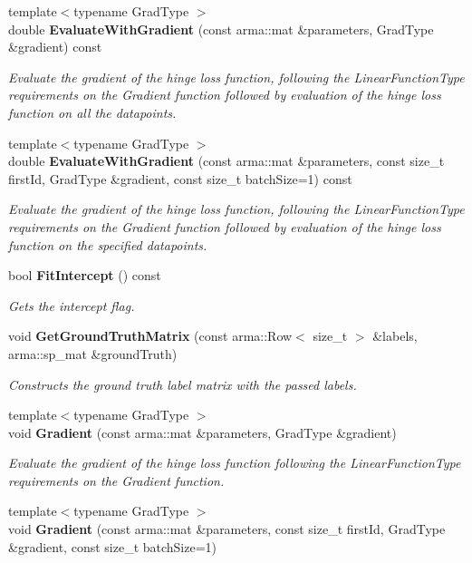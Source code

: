 \begin{DoxyCompactItemize}
{\footnotesize template$<$typename Grad\+Type $>$ }\\double \textbf{ Evaluate\+With\+Gradient} (const arma\+::mat \&parameters, Grad\+Type \&gradient) const
\begin{DoxyCompactList}\small\item\em Evaluate the gradient of the hinge loss function, following the Linear\+Function\+Type requirements on the Gradient function followed by evaluation of the hinge loss function on all the datapoints. \end{DoxyCompactList}\item 
{\footnotesize template$<$typename Grad\+Type $>$ }\\double \textbf{ Evaluate\+With\+Gradient} (const arma\+::mat \&parameters, const size\+\_\+t first\+Id, Grad\+Type \&gradient, const size\+\_\+t batch\+Size=1) const
\begin{DoxyCompactList}\small\item\em Evaluate the gradient of the hinge loss function, following the Linear\+Function\+Type requirements on the Gradient function followed by evaluation of the hinge loss function on the specified datapoints. \end{DoxyCompactList}\item 
bool \textbf{ Fit\+Intercept} () const
\begin{DoxyCompactList}\small\item\em Gets the intercept flag. \end{DoxyCompactList}\item 
void \textbf{ Get\+Ground\+Truth\+Matrix} (const arma\+::\+Row$<$ size\+\_\+t $>$ \&labels, arma\+::sp\+\_\+mat \&ground\+Truth)
\begin{DoxyCompactList}\small\item\em Constructs the ground truth label matrix with the passed labels. \end{DoxyCompactList}\item 
{\footnotesize template$<$typename Grad\+Type $>$ }\\void \textbf{ Gradient} (const arma\+::mat \&parameters, Grad\+Type \&gradient)
\begin{DoxyCompactList}\small\item\em Evaluate the gradient of the hinge loss function following the Linear\+Function\+Type requirements on the Gradient function. \end{DoxyCompactList}\item 
{\footnotesize template$<$typename Grad\+Type $>$ }\\void \textbf{ Gradient} (const arma\+::mat \&parameters, const size\+\_\+t first\+Id, Grad\+Type \&gradient, const size\+\_\+t batch\+Size=1)

\end{DoxyCompactItemize}
